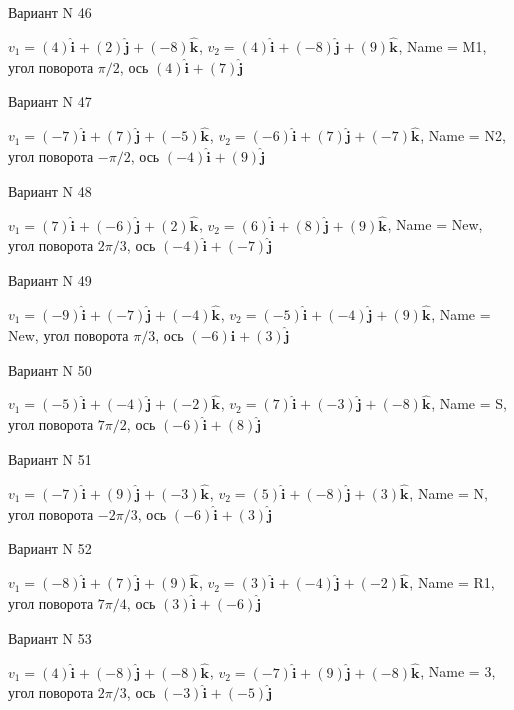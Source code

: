 \documentclass[11pt]{report}
\begin{document}
Вариант N 46

$v_1 = (4)\mathbf{\hat{i}_{}} + (2)\mathbf{\hat{j}_{}} + (-8)\mathbf{\hat{k}_{}}$, $v_2 = (4)\mathbf{\hat{i}_{}} + (-8)\mathbf{\hat{j}_{}} + (9)\mathbf{\hat{k}_{}}$, Name = M1, угол поворота $\pi / 2$, ось $(4)\mathbf{\hat{i}_{}} + (7)\mathbf{\hat{j}_{}}$

Вариант N 47

$v_1 = (-7)\mathbf{\hat{i}_{}} + (7)\mathbf{\hat{j}_{}} + (-5)\mathbf{\hat{k}_{}}$, $v_2 = (-6)\mathbf{\hat{i}_{}} + (7)\mathbf{\hat{j}_{}} + (-7)\mathbf{\hat{k}_{}}$, Name = N2, угол поворота $- \pi / 2$, ось $(-4)\mathbf{\hat{i}_{}} + (9)\mathbf{\hat{j}_{}}$

Вариант N 48

$v_1 = (7)\mathbf{\hat{i}_{}} + (-6)\mathbf{\hat{j}_{}} + (2)\mathbf{\hat{k}_{}}$, $v_2 = (6)\mathbf{\hat{i}_{}} + (8)\mathbf{\hat{j}_{}} + (9)\mathbf{\hat{k}_{}}$, Name = New, угол поворота $2 \pi / 3$, ось $(-4)\mathbf{\hat{i}_{}} + (-7)\mathbf{\hat{j}_{}}$

Вариант N 49

$v_1 = (-9)\mathbf{\hat{i}_{}} + (-7)\mathbf{\hat{j}_{}} + (-4)\mathbf{\hat{k}_{}}$, $v_2 = (-5)\mathbf{\hat{i}_{}} + (-4)\mathbf{\hat{j}_{}} + (9)\mathbf{\hat{k}_{}}$, Name = New, угол поворота $\pi / 3$, ось $(-6)\mathbf{\hat{i}_{}} + (3)\mathbf{\hat{j}_{}}$

Вариант N 50

$v_1 = (-5)\mathbf{\hat{i}_{}} + (-4)\mathbf{\hat{j}_{}} + (-2)\mathbf{\hat{k}_{}}$, $v_2 = (7)\mathbf{\hat{i}_{}} + (-3)\mathbf{\hat{j}_{}} + (-8)\mathbf{\hat{k}_{}}$, Name = S, угол поворота $7 \pi / 2$, ось $(-6)\mathbf{\hat{i}_{}} + (8)\mathbf{\hat{j}_{}}$

Вариант N 51

$v_1 = (-7)\mathbf{\hat{i}_{}} + (9)\mathbf{\hat{j}_{}} + (-3)\mathbf{\hat{k}_{}}$, $v_2 = (5)\mathbf{\hat{i}_{}} + (-8)\mathbf{\hat{j}_{}} + (3)\mathbf{\hat{k}_{}}$, Name = N, угол поворота $- 2 \pi / 3$, ось $(-6)\mathbf{\hat{i}_{}} + (3)\mathbf{\hat{j}_{}}$

Вариант N 52

$v_1 = (-8)\mathbf{\hat{i}_{}} + (7)\mathbf{\hat{j}_{}} + (9)\mathbf{\hat{k}_{}}$, $v_2 = (3)\mathbf{\hat{i}_{}} + (-4)\mathbf{\hat{j}_{}} + (-2)\mathbf{\hat{k}_{}}$, Name = R1, угол поворота $7 \pi / 4$, ось $(3)\mathbf{\hat{i}_{}} + (-6)\mathbf{\hat{j}_{}}$

Вариант N 53

$v_1 = (4)\mathbf{\hat{i}_{}} + (-8)\mathbf{\hat{j}_{}} + (-8)\mathbf{\hat{k}_{}}$, $v_2 = (-7)\mathbf{\hat{i}_{}} + (9)\mathbf{\hat{j}_{}} + (-8)\mathbf{\hat{k}_{}}$, Name = 3, угол поворота $2 \pi / 3$, ось $(-3)\mathbf{\hat{i}_{}} + (-5)\mathbf{\hat{j}_{}}$
\end{document}
